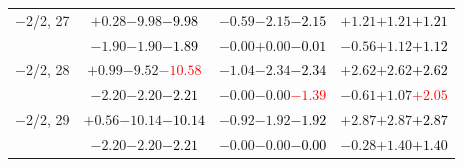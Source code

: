 \documentclass[compress]{beamer}
\begin{document}
\begin{frame}
\begin{tabular}{r | c | c | c}
$-$2/2, 27 & $+0.28$\hspace{0.1 cm}$-9.98$\hspace{0.1 cm}\textcolor{black}{$-9.98$} & $-0.59$\hspace{0.1 cm}$-2.15$\hspace{0.1 cm}\textcolor{black}{$-2.15$} & $+1.21$\hspace{0.1 cm}$+1.21$\hspace{0.1 cm}\textcolor{black}{$+1.21$} \\
           & $-1.90$\hspace{0.1 cm}$-1.90$\hspace{0.1 cm}\textcolor{black}{$-1.89$} & $-0.00$\hspace{0.1 cm}$+0.00$\hspace{0.1 cm}\textcolor{black}{$-0.01$} & $-0.56$\hspace{0.1 cm}$+1.12$\hspace{0.1 cm}\textcolor{black}{$+1.12$} \\
$-$2/2, 28 & $+0.99$\hspace{0.1 cm}$-9.52$\hspace{0.1 cm}\textcolor{red}{$-10.58$} & $-1.04$\hspace{0.1 cm}$-2.34$\hspace{0.1 cm}\textcolor{black}{$-2.34$} & $+2.62$\hspace{0.1 cm}$+2.62$\hspace{0.1 cm}\textcolor{black}{$+2.62$} \\
           & $-2.20$\hspace{0.1 cm}$-2.20$\hspace{0.1 cm}\textcolor{black}{$-2.21$} & $-0.00$\hspace{0.1 cm}$-0.00$\hspace{0.1 cm}\textcolor{red}{$-1.39$} & $-0.61$\hspace{0.1 cm}$+1.07$\hspace{0.1 cm}\textcolor{red}{$+2.05$} \\
$-$2/2, 29 & $+0.56$\hspace{0.1 cm}$-10.14$\hspace{0.1 cm}\textcolor{black}{$-10.14$} & $-0.92$\hspace{0.1 cm}$-1.92$\hspace{0.1 cm}\textcolor{black}{$-1.92$} & $+2.87$\hspace{0.1 cm}$+2.87$\hspace{0.1 cm}\textcolor{black}{$+2.87$} \\
           & $-2.20$\hspace{0.1 cm}$-2.20$\hspace{0.1 cm}\textcolor{black}{$-2.21$} & $-0.00$\hspace{0.1 cm}$-0.00$\hspace{0.1 cm}\textcolor{black}{$-0.00$} & $-0.28$\hspace{0.1 cm}$+1.40$\hspace{0.1 cm}\textcolor{black}{$+1.40$} \\

\end{tabular}
\end{frame}
\end{document}
